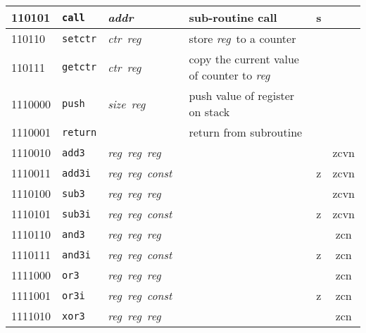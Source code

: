 \documentclass[architecture]{compas2018}
\newcommand{\reg}{\textit{reg}}
\newcommand{\const}{\textit{const}}
\newcommand{\ctr}{\textit{ctr}}
\newcommand{\size}{\textit{size}}
\newcommand{\addr}{\textit{addr}}
\begin{document}
\begin{table}[!h]
\begin{center}
\begin{tabular}{|l|l|l|l|l|c|}
    \hline
    110101  & \texttt{call}   & \addr\                        & sub-routine call                                     & s    &             \\
    \hline
    110110  & \texttt{setctr} & \ctr\ \reg\                   & store \reg\ to a counter                             &      &             \\
    \hline
    110111  & \texttt{getctr} & \ctr\ \reg\                   & copy the current value of counter to \reg\         &      &             \\
    \hline
    1110000 & \texttt{push}   & \size\ \reg\                  & push value of register on stack                      &      &             \\
    \hline
    1110001 & \texttt{return} &                               & return from subroutine                               &      &             \\
    \hline
    1110010 & \texttt{add3}   & \reg\ \reg\ \reg\             &                                                      &      & zcvn        \\
    \hline
    1110011 & \texttt{add3i}  & \reg\ \reg\ \const\           &                                                      & z    & zcvn        \\
    \hline
    1110100 & \texttt{sub3}   & \reg\ \reg\ \reg\             &                                                      &      & zcvn        \\
    \hline
    1110101 & \texttt{sub3i}  & \reg\ \reg\ \const\           &                                                      & z    & zcvn        \\
    \hline
    1110110 & \texttt{and3}   & \reg\  \reg\ \reg\            &                                                      &      & zcn         \\
    \hline
    1110111 & \texttt{and3i}  & \reg\ \reg\ \const\           &                                                      & {z}  & zcn         \\
    \hline
    1111000 & \texttt{or3}    & \reg\ \reg\ \reg\             &                                                      &      & zcn         \\
    \hline
    1111001 & \texttt{or3i}   & \reg\ \reg\ \const\           &                                                      & {z}  & zcn         \\
    \hline
    1111010 & \texttt{xor3}   & \reg\ \reg\ \reg\             &                                                      &      & zcn         \\

\end{tabular}
\end{center}
\end{table}
\end{document}
